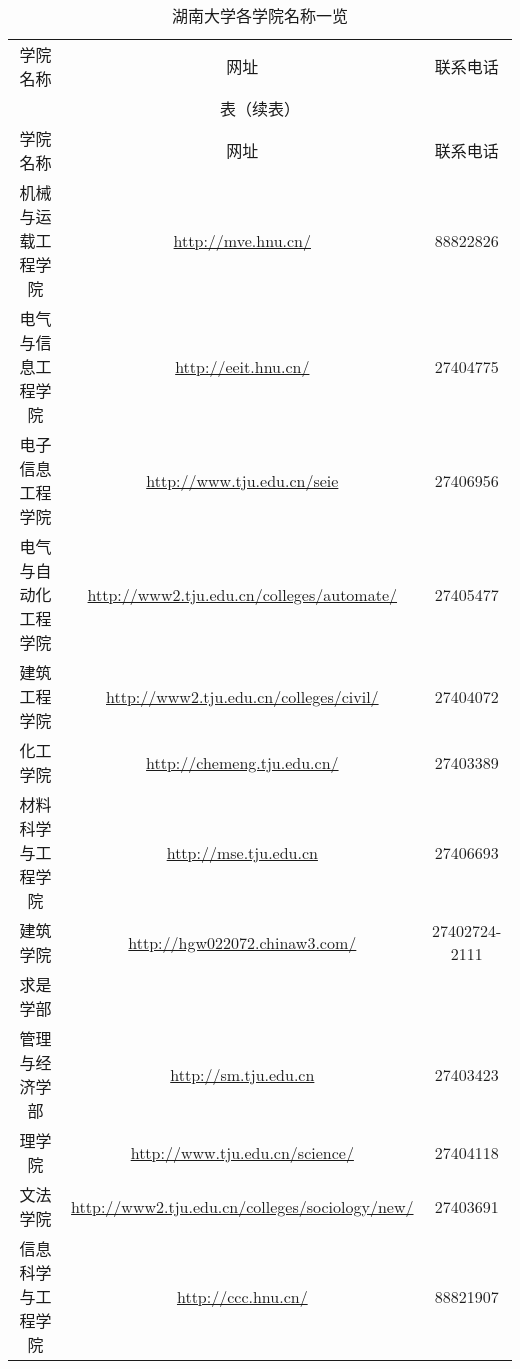 \begin{longtable}{ccc}
	\caption{湖南大学各学院名称一览}\label{tab:table2}
	\vspace{0.5em}                                                                                   \\
	\toprule[1.5pt] 学院名称 & 网址                                                  & 联系电话      \\ \midrule[1pt]
	\endfirsthead
	\multicolumn{3}{c}{表\thetable（续表）}\vspace{0.5em}                                           \\
	\toprule[1.5pt] 学院名称 & 网址                                                  & 联系电话      \\ \midrule[1pt]
	\endhead
	\bottomrule[1.5pt]
	\endfoot
	机械与运载工程学院       & \url{http://mve.hnu.cn/}                              & 88822826      \\
	电气与信息工程学院       & \url{http://eeit.hnu.cn/}                             & 27404775      \\
	电子信息工程学院         & \url{http://www.tju.edu.cn/seie}                      & 27406956      \\
	电气与自动化工程学院     & \url{http://www2.tju.edu.cn/colleges/automate/}       & 27405477      \\
	建筑工程学院             & \url{http://www2.tju.edu.cn/colleges/civil/}          & 27404072      \\
	化工学院                 & \url{http://chemeng.tju.edu.cn/}                      & 27403389      \\
	材料科学与工程学院       & \url{http://mse.tju.edu.cn}                           & 27406693      \\
	建筑学院                 & \url{http://hgw022072.chinaw3.com/}                   & 27402724-2111 \\
	求是学部                                                                                         \\
	管理与经济学部           & \url{ http://sm.tju.edu.cn}                           & 27403423      \\
	理学院                   & \url{ http://www.tju.edu.cn/science/}                 & 27404118      \\
	文法学院                 & \url{ http://www2.tju.edu.cn/colleges/sociology/new/} & 27403691      \\
	信息科学与工程学院       & \url{http://ccc.hnu.cn/}                              & 88821907      \\

\end{longtable}
